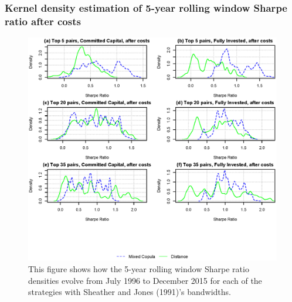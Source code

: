 \documentclass[pdf,10pt,xcolor=dvipsnames,hide notes]{beamer}
\begin{document}
\begin{frame}[label=frame5c]
\frametitle{Kernel density estimation of 5-year rolling window Sharpe ratio after costs}

\begin{figure}[!ht]
	\centering
	\includegraphics[scale=0.47]{Figure5.eps}
	\captionsetup{justification=raggedright,
		singlelinecheck=false
	}
	\caption*{\tiny  This figure shows how the 5-year rolling window Sharpe ratio densities evolve from July 1996 to December 2015 for each of the strategies with Sheather and Jones (1991)'s bandwidths.}
	\label{fig:fig5}
\end{figure}

\end{frame}


\section{}
\end{document}
